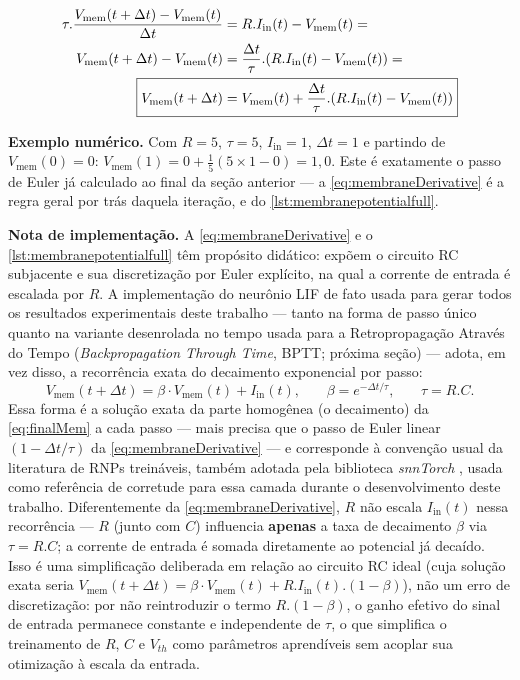 			\begin{equation}
				\label{eq:membraneDerivative}
				\begin{aligned}
					\tau.\dfrac{V_{\text{mem}}(t+\Delta t) - V_{\text{mem}}(t)}{\Delta t} &= R.I_{\text{in}}(t) - V_{\text{mem}}(t) = \\
					V_{\text{mem}}(t+\Delta t) - V_{\text{mem}}(t) &= \frac{\Delta t}{\tau} . (R.I_{\text{in}}(t) - V_{\text{mem}}(t)) = \\
					\Aboxed{V_{\text{mem}}(t+\Delta t) &= V_{\text{mem}}(t) + \frac{\Delta t}{\tau} . (R.I_{\text{in}}(t) - V_{\text{mem}}(t))}
				\end{aligned}
			\end{equation}
			\par \textbf{Exemplo numérico.} Com $R=5$, $\tau=5$, $I_{\text{in}}=1$, $\Delta t=1$ e partindo de $V_{\text{mem}}(0)=0$: $V_{\text{mem}}(1) = 0 + \frac{1}{5}(5\times1 - 0) = 1{,}0$. Este é exatamente o passo de Euler já calculado ao final da seção anterior --- a \autoref{eq:membraneDerivative} é a regra geral por trás daquela iteração, e do \autoref{lst:membranepotentialfull}.

			\par \textbf{Nota de implementação.} A \autoref{eq:membraneDerivative} e o \autoref{lst:membranepotentialfull} têm propósito didático: expõem o circuito RC subjacente e sua discretização por Euler explícito, na qual a corrente de entrada é escalada por $R$. A implementação do neurônio LIF de fato usada para gerar todos os resultados experimentais deste trabalho --- tanto na forma de passo único quanto na variante desenrolada no tempo usada para a Retropropagação Através do Tempo (\textit{Backpropagation Through Time}, BPTT; próxima seção) --- adota, em vez disso, a recorrência exata do decaimento exponencial por passo:
			\begin{equation}
				\label{eq:lifExactRecurrence}
				V_{\text{mem}}(t+\Delta t) = \beta \cdot V_{\text{mem}}(t) + I_{\text{in}}(t) \text{,} \qquad \beta = e^{-\Delta t/\tau} \text{,} \qquad \tau = R.C \text{.}
			\end{equation}
			Essa forma é a solução exata da parte homogênea (o decaimento) da \autoref{eq:finalMem} a cada passo --- mais precisa que o passo de Euler linear $(1-\Delta t/\tau)$ da \autoref{eq:membraneDerivative} --- e corresponde à convenção usual da literatura de RNPs treináveis, também adotada pela biblioteca \textit{snnTorch} \cite{10242251}, usada como referência de corretude para essa camada durante o desenvolvimento deste trabalho. Diferentemente da \autoref{eq:membraneDerivative}, $R$ não escala $I_{\text{in}}(t)$ nessa recorrência --- $R$ (junto com $C$) influencia \textbf{apenas} a taxa de decaimento $\beta$ via $\tau=R.C$; a corrente de entrada é somada diretamente ao potencial já decaído. Isso é uma simplificação deliberada em relação ao circuito RC ideal (cuja solução exata seria $V_{\text{mem}}(t+\Delta t) = \beta \cdot V_{\text{mem}}(t) + R.I_{\text{in}}(t).(1-\beta)$), não um erro de discretização: por não reintroduzir o termo $R.(1-\beta)$, o ganho efetivo do sinal de entrada permanece constante e independente de $\tau$, o que simplifica o treinamento de $R$, $C$ e $V_{th}$ como parâmetros aprendíveis sem acoplar sua otimização à escala da entrada.

